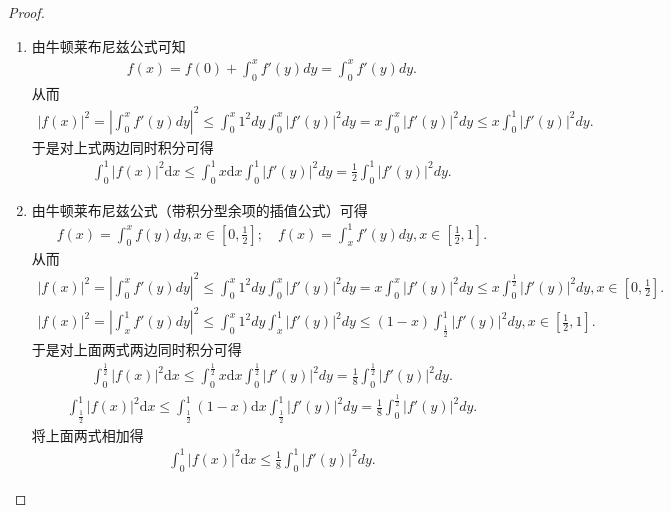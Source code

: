\documentclass[../../main.tex]{subfiles}
\begin{document}
\begin{proof}
\begin{enumerate}
\item 由牛顿莱布尼兹公式可知
\begin{align*}
f(x) = f(0) + \int_{0}^{x}f'(y)dy=\int_{0}^{x}f'(y)dy.
\end{align*}
从而
\begin{align*}
|f(x)|^2 = \left| \int_{0}^{x}f'(y)dy \right|^2 \leqslant \int_{0}^{x}1^2dy \int_{0}^{x}|f'(y)|^2dy = x\int_{0}^{x}|f'(y)|^2dy \leqslant x\int_{0}^{1}|f'(y)|^2dy.
\end{align*}
于是对上式两边同时积分可得
\begin{align*}
\int_{0}^{1}|f(x)|^2\mathrm{d}x \leqslant \int_{0}^{1}x\mathrm{d}x \int_{0}^{1}|f'(y)|^2dy = \frac{1}{2}\int_{0}^{1}|f'(y)|^2dy.
\end{align*}

\item 由牛顿莱布尼兹公式（带积分型余项的插值公式）可得
\begin{align*}
f(x) = \int_{0}^{x}f(y)dy, x \in \left[0, \frac{1}{2}\right]; \quad f(x) = \int_{x}^{1}f'(y)dy, x \in \left[\frac{1}{2}, 1\right].
\end{align*}
从而
\begin{align*}
|f(x)|^2 = \left| \int_{0}^{x}f'(y)dy \right|^2 \leqslant \int_{0}^{x}1^2dy\int_{0}^{x}|f'(y)|^2dy = x\int_{0}^{x}|f'(y)|^2dy \leqslant x\int_{0}^{\frac{1}{2}}|f'(y)|^2dy, x \in \left[0, \frac{1}{2}\right].
\end{align*}
\begin{align*}
|f(x)|^2 = \left| \int_{x}^{1}f'(y)dy \right|^2 \leqslant \int_{0}^{x}1^2dy\int_{x}^{1}|f'(y)|^2dy \leqslant (1 - x)\int_{\frac{1}{2}}^{1}|f'(y)|^2dy, x \in \left[\frac{1}{2}, 1\right].
\end{align*}
于是对上面两式两边同时积分可得
\begin{align*}
\int_{0}^{\frac{1}{2}}|f(x)|^2\mathrm{d}x \leqslant \int_{0}^{\frac{1}{2}}x\mathrm{d}x\int_{0}^{\frac{1}{2}}|f'(y)|^2dy = \frac{1}{8}\int_{0}^{\frac{1}{2}}|f'(y)|^2dy.
\end{align*}
\begin{align*}
\int_{\frac{1}{2}}^{1}|f(x)|^2\mathrm{d}x \leqslant \int_{\frac{1}{2}}^{1}(1 - x)\mathrm{d}x\int_{\frac{1}{2}}^{1}|f'(y)|^2dy = \frac{1}{8}\int_{0}^{\frac{1}{2}}|f'(y)|^2dy.
\end{align*}
将上面两式相加得
\begin{align*}
\int_{0}^{1}|f(x)|^2\mathrm{d}x \leqslant \frac{1}{8}\int_{0}^{1}|f'(y)|^2dy.
\end{align*}
\end{enumerate}
\end{proof}
\end{document}

